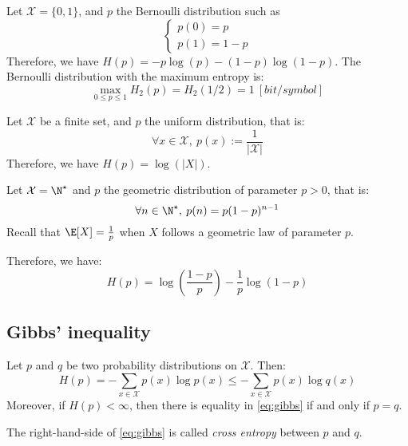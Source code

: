 \documentclass{../cs-classes/cs-classes}
\newcommand*{\X}{\mathcal{X}}
\begin{document}
\begin{example}
    Let $\mathcal{X}=\{0, 1\}$, and $p$ the Bernoulli distribution such as
    \begin{equation*}
        \begin{cases}
            p(0) = p\\
            p(1) = 1 - p
        \end{cases}
    \end{equation*}
    Therefore, we have $H(p)=-p\log(p) - (1-p)\log(1-p)$. The Bernoulli distribution with the maximum entropy is:
    \begin{equation*}
        \max_{0\leq p\leq 1} H_2(p) = H_2(1/2) = 1 \: [bit/symbol]
    \end{equation*}
\end{example}

\begin{example}
    Let $\mathcal{X}$ be a finite set, and $p$ the uniform distribution, that is:
    \begin{equation*}
        \forall x\in \X, \: p(x) := \frac{1}{|\X|}
    \end{equation*}
    Therefore, we have $H(p) = \log(|X|)$.
\end{example}

\begin{example}
    Let $\X = \N^\star$ and $p$ the geometric distribution of parameter $p>0$, that is:
    \begin{equation*}
        \forall n\in \N^\star, \: p(n) = p(1-p)^{n-1}
    \end{equation*}
    Recall that $\E[X] = \frac{1}{p}$ when $X$ follows a geometric law of parameter $p$.

    Therefore, we have:
    \begin{equation*}
        H(p) = \log\left(\frac{1-p}{p}\right) - \frac{1}{p}\log(1-p)
    \end{equation*}
\end{example}

\subsection{Gibbs' inequality}
\begin{theorem}
    Let $p$ and $q$ be two probability distributions on $\X$. Then:
    \begin{equation}
        \label{eq:gibbs}
        H(p) = -\sum_{x\in\X} p(x)\log p(x)  \leq - \sum_{x\in\X} p(x)\log q(x)
    \end{equation}
    Moreover, if $H(p)<\infty$, then there is equality in \eqref{eq:gibbs} if and only if $p=q$.
\end{theorem}
The right-hand-side of \eqref{eq:gibbs} is called \emph{cross entropy} between $p$ and $q$.
\end{document}
